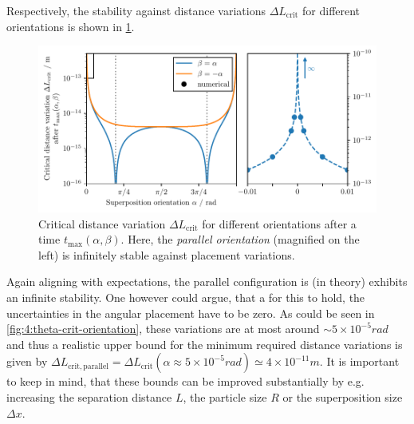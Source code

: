 Respectively, the stability against distance variations $\Delta L_\mathrm{crit}$ for different orientations is shown in \cref{fig:4:L-crit-orientation}.
\begin{figure}[!htbp]
  \centering
  \includegraphics[width=\textwidth]{./../figures/L-variance/L-crit-orientation-complete.pdf}
  \caption{Critical distance variation $\Delta L_\mathrm{crit}$ for different orientations after a time $t_\mathrm{max}(\alpha,\beta)$. Here, the \emph{parallel orientation} (magnified on the left) is infinitely stable against placement variations.}
  \label{fig:4:L-crit-orientation}
\end{figure}
Again aligning with expectations, the parallel configuration is (in theory) exhibits an infinite stability.
One however could argue, that a for this to hold, the uncertainties in the angular placement have to be zero. As could be seen in \cref{fig:4:theta-crit-orientation}, these variations are at most around $\sim 5 \times 10^{-5}\si{rad}$ and thus a realistic upper bound for the minimum required distance variations is given by $\Delta L_\mathrm{crit,parallel} = \Delta L_\mathrm{crit}(\alpha \approx 5\times 10^{-5}\si{rad}) \simeq 4\times 10^{-11}\si{m}$.
It is important to keep in mind, that these bounds can be improved substantially by e.g. increasing the separation distance $L$, the particle size $R$ or the superposition size $\Delta x$.

